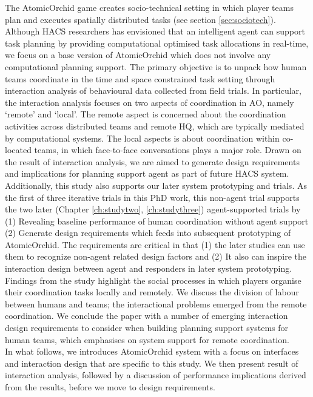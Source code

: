 The AtomicOrchid game creates socio-technical setting in which player teams plan and executes spatially distributed tasks (see section \ref{sec:sociotech}). Although \ac{HACS} researchers has envisioned that an intelligent agent can support task planning by providing computational optimised task allocations in real-time, we focus on a base version of AtomicOrchid which does not involve any computational planning support. The primary objective is to unpack how human teams coordinate in the time and space constrained task setting through interaction analysis of behavioural data collected from field trials. In particular, the interaction analysis focuses on two aspects of coordination in AO, namely `remote' and `local'. The remote aspect is concerned about the coordination activities across distributed teams and remote HQ, which are typically mediated by computational systems. The local aspects is about coordination within co-located teams, in which face-to-face conversations plays a major role. Drawn on the result of interaction analysis, we are aimed to generate design requirements and implications for planning support agent as part of future \ac{HACS} system.      \\

Additionally, this study also supports our later system prototyping and trials. As the first of three iterative trials in this PhD work, this non-agent trial supports the two later (Chapter \ref{ch:studytwo}, \ref{ch:studythree}) agent-supported trials by (1) Revealing baseline performance of human coordination without agent support (2) Generate design requirements which feeds into subsequent prototyping of AtomicOrchid. The requirements are critical in that (1) the later studies can use them to recognize non-agent related design factors and (2) It also can inspire the interaction design between agent and responders in later system prototyping.  \\

Findings from the study highlight the social processes in which players organise their coordination tasks locally and remotely. We discuss the division of labour between humans and teams; the interactional problems emerged from the remote coordination. We conclude the paper with a number of emerging interaction design requirements to consider when building planning support systems for human teams, which emphasises on system support for remote coordination. \\

In what follows, we introduces AtomicOrchid system with a focus on interfaces and interaction design that are specific to this study. We then present result of interaction analysis, followed by a discussion of performance implications derived from the results, before we move to design requirements. \\

